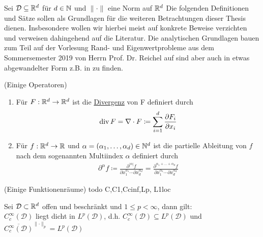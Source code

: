 Sei $\mathcal{D} \subseteq \mathbb{R}^d$ für $d\in \mathbb{N}$ und $\lVert \cdot \rVert$ eine Norm auf $\mathbb{R}^d$
Die folgenden Definitionen und Sätze sollen als Grundlagen für die weiteren Betrachtungen dieser Thesis dienen. Insbesondere wollen wir hierbei meist auf konkrete Beweise verzichten und verweisen dahingehend auf die Literatur. 
Die analytischen Grundlagen bauen zum Teil auf der Vorlesung Rand- und Eigenwertprobleme aus dem Sommersemester 2019 von Herrn Prof. Dr. Reichel auf sind aber auch in etwas abgewandelter Form z.B. in \cite{dobrowolski2010angewandte} zu finden.
\begin{Definition}(Einige Operatoren)
	\begin{enumerate}[label=(\alph*)]
		\item Für $F: \mathbb{R}^d \to \mathbb{R}^d$ ist die \underline{Divergenz} von F definiert durch
			\begin{align*}
				\operatorname{div} F = \nabla \cdot F \coloneqq \sum_{i=1}^{d} \frac{\partial F_i}{ \partial x_i}
			\end{align*}
		\item Für $f: \mathbb{R}^d \to \mathbb{R}$ und $\alpha = (\alpha_1,\dots,\alpha_d) \in \mathbb{N}^d$ ist die partielle Ableitung von $f$ nach dem sogenannten Multiindex $\alpha$ definiert durch
			\begin{align*}
				\partial^{\alpha}f \coloneqq 
				\frac{\partial^{|\alpha|} f}{\partial x_1 ^{\alpha_1} \cdots  \partial x_d^{\alpha_d} } 
				=\frac{\partial^{\alpha_1+\dots +\alpha_d} f}{\partial x_1 ^{\alpha_1} \cdots  \partial x_d^{\alpha_d} } 
			\end{align*}
	\end{enumerate}
\end{Definition}

\begin{Definition}(Einige Funktionenräume)
	todo C,C1,Ccinf,Lp, L1loc
\end{Definition}

\begin{Satz}
	Sei $ \mathcal{D} \subset \mathbb{R}^d $ offen und beschränkt und $ 1 \leq p < \infty $, dann gilt: \\
	$ C_c^{\infty} (\mathcal{D})$ liegt dicht in $ L^p(\mathcal{D}) $, d.h. $ C_c^{\infty}(\mathcal{D}) \subseteq L^p(\mathcal{D})$ und $ \overline{ C_c^{\infty}(\mathcal{D}) }^{\lVert \cdot \rVert_p}  = L^p(\mathcal{D})$
\end{Satz}


